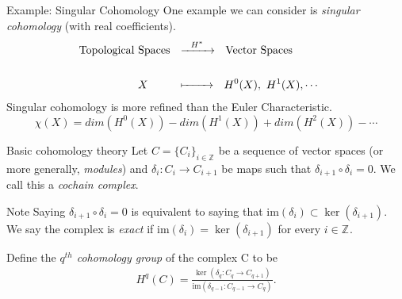 \documentclass{beamer}
\newcommand{\Z}[1]{\mathbb{Z}^{#1}}
\newcommand{\im}{\mbox{im}}
\begin{document}
\begin{frame}{Example: Singular Cohomology}
One example we can consider is \emph{singular cohomology} (with real coefficients).
\begin{align*}
\mbox{Topological Spaces} ~~ &\xrightarrow{~~H^{*}~~} ~~ \mbox{Vector Spaces}~~~~~~~~~~~\\
\\
X ~~~~~~~~ &\xmapsto{~~~~~~~} ~~ H^{0}(X),\ H^{1}(X),\cdots
\end{align*}
Singular cohomology is more refined than the Euler Characteristic.
\[
\chi(X) = dim(H^{0}(X)) - dim(H^{1}(X)) + dim(H^{2}(X)) - \cdots
\]
\end{frame}



\begin{frame}{Basic cohomology theory}
Let $C=\{C_i\}_{i\in\Z{}}$ be a sequence of vector spaces (or more generally, \emph{modules}) and $\delta_{i}:C_i \to C_{i+1}$ be maps such that $\delta_{i+1}\!\circ\delta_{i}=0$. We call this a \emph{cochain complex}.

\begin{center}
\end{center}

\begin{block}{Note}
Saying $\delta_{i+1}\!\circ\delta_{i}=0$ is equivalent to saying that $\im(\delta_{i}) \subset \ker(\delta_{i+1})$. We say the complex is \emph{exact} if $\im(\delta_{i}) = \ker(\delta_{i+1})$ for every $i \in \Z{}$.
\end{block}

Define the \emph{$q^{th}$ cohomology group} of the complex C to be
\begin{align*}
H^{q}(C)=\frac{\ker(\delta_{q}:C_{q} \to C_{q+1})}{\im(\delta_{q-1}:C_{q-1} \to C_{q})}.
\end{align*}
\end{frame}
\end{document}
